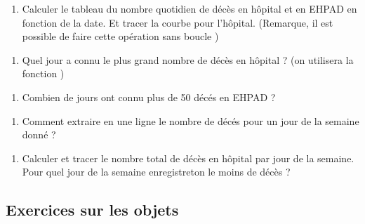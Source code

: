\documentclass[letterpaper,10pt,english]{sphinxhowto}
\begin{document}
\begin{enumerate}
%
\setcounter{enumi}{5}
\item {} 
\sphinxAtStartPar
Calculer le tableau du nombre quotidien de décès en hôpital et en EHPAD en fonction de la date. Et tracer la courbe pour l’hôpital. (Remarque, il est possible de faire cette opération sans boucle )

\end{enumerate}
\begin{enumerate}
%
\setcounter{enumi}{6}
\item {} 
\sphinxAtStartPar
Quel jour a connu le plus grand nombre de décès en hôpital ? (on utilisera la fonction )

\end{enumerate}
\begin{enumerate}
%
\setcounter{enumi}{7}
\item {} 
\sphinxAtStartPar
Combien de jours ont connu plus de 50 décés en EHPAD ?

\end{enumerate}
\begin{enumerate}
%
\setcounter{enumi}{8}
\item {} 
\sphinxAtStartPar
Comment extraire en une ligne le nombre de décés pour un jour de la semaine donné ?

\end{enumerate}
\begin{enumerate}
%
\setcounter{enumi}{9}
\item {} 
\sphinxAtStartPar
Calculer et tracer le nombre total de décès en hôpital par jour de la semaine. Pour quel jour de la semaine enregistre\sphinxhyphen{}t\sphinxhyphen{}on le moins de décès ?

\end{enumerate}


\subsection{Exercices sur les objets}
\label{\detokenize{exercices_objets:exercices-sur-les-objets}}\label{\detokenize{exercices_objets::doc}}
\end{document}
